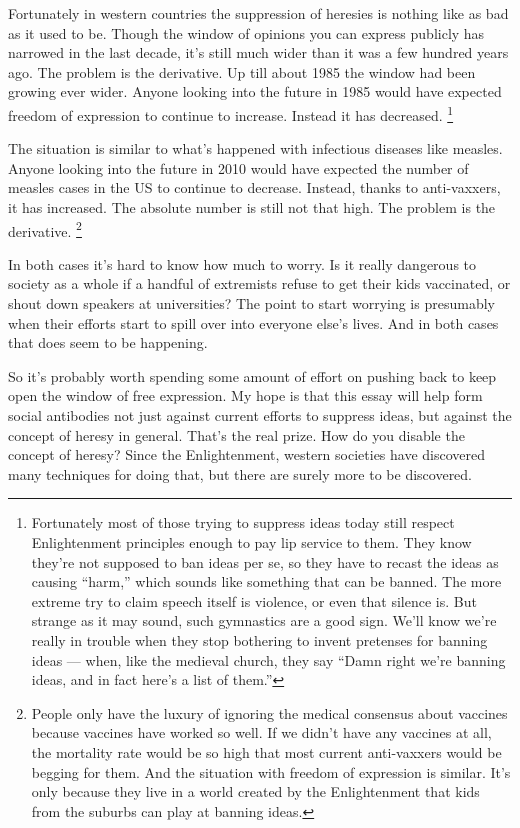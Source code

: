 \documentclass[12pt]{book}
\begin{document}
Fortunately in western countries the suppression of heresies is nothing
like as bad as it used to be. Though the window of opinions you can
express publicly has narrowed in the last decade, it's still much wider
than it was a few hundred years ago. The problem is the derivative. Up
till about 1985 the window had been growing ever wider. Anyone looking
into the future in 1985 would have expected freedom of expression to
continue to increase. Instead it has decreased. \footnote{Fortunately most of those trying to suppress ideas today still
respect Enlightenment principles enough to pay lip service to them. They
know they're not supposed to ban ideas per se, so they have to recast
the ideas as causing ``harm,'' which sounds like something that can be
banned. The more extreme try to claim speech itself is violence, or even
that silence is. But strange as it may sound, such gymnastics are a good
sign. We'll know we're really in trouble when they stop bothering to
invent pretenses for banning ideas --- when, like the medieval church,
they say ``Damn right we're banning ideas, and in fact here's a list of
them.''}

The situation is similar to what's happened with infectious diseases
like measles. Anyone looking into the future in 2010 would have expected
the number of measles cases in the US to continue to decrease. Instead,
thanks to anti-vaxxers, it has increased. The absolute number is still
not that high. The problem is the derivative. \footnote{People only have the luxury of ignoring the medical consensus
about vaccines because vaccines have worked so well. If we didn't have
any vaccines at all, the mortality rate would be so high that most
current anti-vaxxers would be begging for them. And the situation with
freedom of expression is similar. It's only because they live in a world
created by the Enlightenment that kids from the suburbs can play at
banning ideas.}

In both cases it's hard to know how much to worry. Is it really
dangerous to society as a whole if a handful of extremists refuse to get
their kids vaccinated, or shout down speakers at universities? The point
to start worrying is presumably when their efforts start to spill over
into everyone else's lives. And in both cases that does seem to be
happening.

So it's probably worth spending some amount of effort on pushing back to
keep open the window of free expression. My hope is that this essay will
help form social antibodies not just against current efforts to suppress
ideas, but against the concept of heresy in general. That's the real
prize. How do you disable the concept of heresy? Since the
Enlightenment, western societies have discovered many techniques for
doing that, but there are surely more to be discovered.
\end{document}
